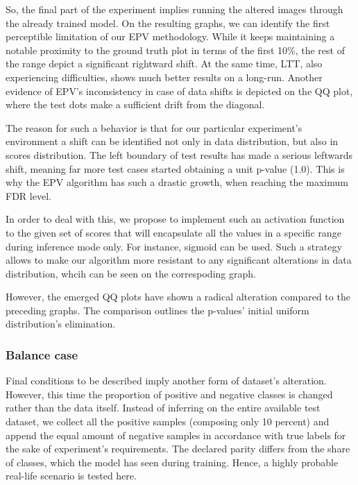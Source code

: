 \documentclass{article}
\begin{document}
So, the final part of the experiment implies running the altered images through the already trained model. On the resulting graphs, we can identify the first perceptible limitation of our EPV methodology. While it keeps maintaining a notable proximity to the ground truth plot in terms of the first 10\%, the rest of the range depict a significant rightward shift. At the same time, LTT, also experiencing difficulties, shows much better results on a long-run. Another evidence of EPV's inconsistency in case of data shifts is depicted on the QQ plot, where the test dots make a sufficient drift from the diagonal. 

The reason for such a behavior is that for our particular experiment's environment a shift can be identified not only in data distribution, but also in scores distribution. The left boundary of test results has made a serious leftwards shift, meaning far more test cases started obtaining a unit p-value (1.0). This is why the EPV algorithm has such a drastic growth, when reaching the maximum FDR level.

In order to deal with this, we propose to implement such an activation function to the given set of scores that will encapsulate all the values in a specific range during inference mode only. For instance, sigmoid can be used. Such a strategy allows to make our algorithm more resistant to any significant alterations in data distribution, whcih can be seen on the correspoding graph.


However, the emerged QQ plots have shown a radical alteration compared to the preceding graphs. The comparison outlines the p-values’ initial uniform distribution’s elimination. 

\subsubsection{Balance case}

Final conditions to be described imply another form of dataset's alteration. However, this time the proportion of positive and negative classes is changed rather than the data itself. Instead of inferring on the entire available test dataset, we collect all the positive samples (composing only 10 percent) and append the equal amount of negative samples in accordance with true labels for the sake of experiment's requirements. The declared parity differs from the share of classes, which the model has seen during training. Hence, a highly probable real-life scenario is tested here.
\end{document}
